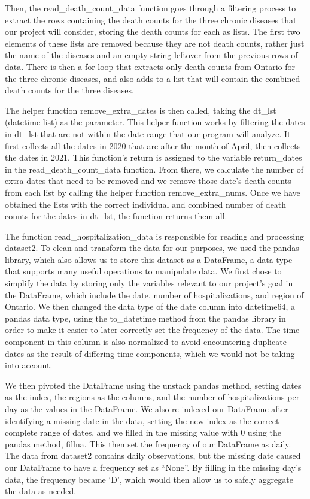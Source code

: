 \documentclass[fontsize=11pt]{article}
\begin{document}
\noindent
Then, the read\_death\_count\_data function goes through a filtering process to extract the rows containing the death counts for the three chronic diseases that our project will consider, storing the death counts for each as lists. The first two elements of these lists are removed because they are not death counts, rather just the name of the diseases and an empty string leftover from the previous rows of data. There is then a for-loop that extracts only death counts from Ontario for the three chronic diseases, and also adds to a list that will contain the combined death counts for the three diseases.


\noindent
The helper function remove\_extra\_dates is then called, taking the dt\_lst (datetime list) as the parameter. This helper function works by filtering the dates in dt\_lst that are not within the date range that our program will analyze. It first collects all the dates in 2020 that are after the month of April, then collects the dates in 2021. This function’s return is assigned to the variable return\_dates in the read\_death\_count\_data function. From there, we calculate the number of extra dates that need to be removed and we remove those date’s death counts from each list by calling the helper function remove\_extra\_nums. Once we have obtained the lists with the correct individual and combined number of death counts for the dates in dt\_lst, the function returns them all.

\noindent
The function read\_hospitalization\_data is responsible for reading and processing dataset2. To clean and transform the data for our purposes, we used the pandas library, which also allows us to store this dataset as a DataFrame, a data type that supports many useful operations to manipulate data. We first chose to simplify the data by storing only the variables relevant to our project’s goal in the DataFrame, which include the date, number of hospitalizations, and region of Ontario. We then changed the data type of the date column into datetime64, a pandas data type, using the to\_datetime method from the pandas library in order to make it easier to later correctly set the frequency of the data. The time component in this column is also normalized to avoid encountering duplicate dates as the result of differing time components, which we would not be taking into account.

\noindent
We then pivoted the DataFrame using the unstack pandas method, setting dates as the index, the regions as the columns, and the number of hospitalizations per day as the values in the DataFrame. We also re-indexed our DataFrame after identifying a missing date in the data, setting the new index as the correct complete range of dates, and we filled in the missing value with 0 using the pandas method, fillna. This then set the frequency of our DataFrame as daily. The data from dataset2 contains daily observations, but the missing date caused our DataFrame to have a frequency set as “None”. By filling in the missing day’s data, the frequency became ‘D’, which would then allow us to safely aggregate the data as needed.
\end{document}
